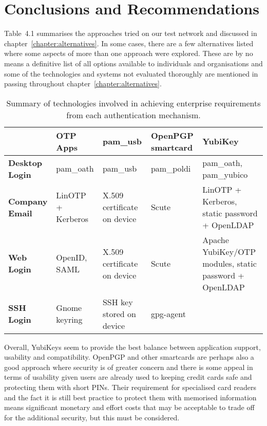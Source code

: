 \documentclass{report}
\begin{document}
\chapter{Conclusions and Recommendations}
\label{chapter:conclusion}

Table~4.1 summarises the approaches tried on our test network
and discussed in chapter~\ref{chapter:alternatives}. In some cases, there
are a few alternatives listed where some aspects of more than one approach
were explored. These are by no means a definitive list of all options available
to individuals and organisations and some of the technologies and systems
not evaluated thoroughly are mentioned in passing throughout
chapter~\ref{chapter:alternatives}.

\begin{sidewaystable}[p]
\centering
  \begin{tabular}{|l|p{4cm}|p{4cm}|p{4cm}|p{4cm}|} \hline
                            & \textbf{OTP Apps} & \textbf{pam\_usb} & \textbf{OpenPGP smartcard} & \textbf{YubiKey} \\ \hline
    \textbf{Desktop Login}  & pam\_oath        & pam\_usb                    & pam\_poldi & pam\_oath, pam\_yubico  \\ \hline
    \textbf{Company Email}  & LinOTP + Kerberos & X.509 certificate on device & Scute      & LinOTP + Kerberos, static password + OpenLDAP   \\ \hline
    \textbf{Web Login}      & OpenID, SAML     & X.509 certificate on device & Scute      & Apache YubiKey/OTP modules, static password + OpenLDAP  \\ \hline
    \textbf{SSH Login}      & Gnome keyring    & SSH key stored on device    & gpg-agent  &  \\ \hline
  \end{tabular}
  \label{table:overview}
  \caption{Summary of technologies involved in achieving enterprise requirements from each authentication mechanism.}
\end{sidewaystable}

Overall, YubiKeys seem to provide the best balance between application support,
usability and compatibility. OpenPGP and other smartcards are perhaps also
a good approach where security is of greater concern and there is some appeal
in terms of usability given users are already used to keeping credit cards
safe and protecting them with short PINs. Their requirement for specialised
card readers and the fact it is still best practice to protect them with memorised
information means significant monetary and effort costs that may be acceptable
to trade off for the additional security, but this must be considered.
\end{document}
